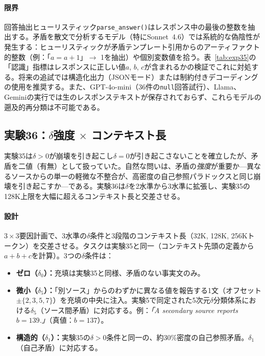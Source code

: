 \documentclass[11pt,a4paper]{article}
\begin{document}
\paragraph{限界}
\label{sec:exp35-limitations}
回答抽出ヒューリスティック\texttt{parse\_answer()}はレスポンス中の最後の整数を抽出する。矛盾を散文で分析するモデル（特にSonnet~4.6）では系統的な偽陰性が発生する：ヒューリスティックが矛盾テンプレート引用からのアーティファクト的整数（例：「$a = a + 1$」$\to$ 1を抽出）や個別変数値を拾う。表~\ref{tab:exp35}の「認識」指標はレスポンスに正しい値$a$, $b$, $c$が含まれるかの検証でこれに対処する。将来の追試では構造化出力（JSONモード）または制約付きデコーディングの使用を推奨する。また、GPT-4o-mini（36件の\texttt{null}回答試行）、Llama、Geminiの実行では生のレスポンステキストが保存されておらず、これらモデルの遡及的再分類は不可能である。

\subsection{実験36：$\delta$強度 $\times$ コンテキスト長}
\label{sec:exp36}

実験35は$\delta > 0$が崩壊を引き起こし$\delta = 0$が引き起こさないことを確立したが、矛盾を二値（有無）として扱っていた。自然な問いは、矛盾の\emph{強度}が重要か---異なるソースからの単一の軽微な不整合が、高密度の自己参照パラドックスと同じ崩壊を引き起こすか---である。実験36は$\delta$を2水準から3水準に拡張し、実験35の128K上限を大幅に超えるコンテキスト長と交差させる。

\paragraph{設計}
$3 \times 3$要因計画で、3水準の$\delta$条件と3段階のコンテキスト長（32K, 128K, 256Kトークン）を交差させる。タスクは実験35と同一（コンテキスト先頭の定義から$a + b + c$を計算）。3つの$\delta$条件は：

\begin{itemize}
  \item \textbf{ゼロ（$\delta_0$）：}充填は実験35と同様、矛盾のない事実文のみ。
  \item \textbf{微小（$\delta_5$）：}「別ソース」からのわずかに異なる値を報告する1文（オフセット$\pm\{2,3,5,7\}$）を充填の中央に注入。実験5で同定された5次元$\delta$分類体系における$\delta_5$（ソース間矛盾）に対応する。例：\emph{「A secondary source reports $b = 139$.」}（真値：$b = 137$）。
  \item \textbf{構造的（$\delta_1$）：}実験35の$\delta > 0$条件と同一の、約30\%密度の自己参照矛盾。$\delta_1$（自己矛盾）に対応する。
\end{itemize}
\end{document}
